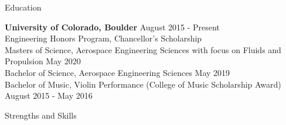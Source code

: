 \documentclass{resume} %
\begin{document}
\begin{rSection}{Education}

{\bf University of Colorado, Boulder} \hfill {August 2015 - Present} \\
{\small Engineering Honors Program, Chancellor's Scholarship\\
Masters of Science, Aerospace Engineering Sciences with focus on Fluids and Propulsion \hfill May 2020 \\
Bachelor of Science, Aerospace Engineering Sciences \hfill  May 2019 \\
Bachelor of Music, Violin Performance (College of Music Scholarship Award) \hfill August 2015 - May 2016}

\end{rSection}


\begin{rSection}{Strengths and Skills}
\end{rSection}







\end{document}
